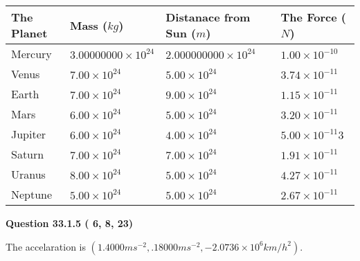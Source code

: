 \documentclass[12pt]{article}
\begin{document}
 
\begin{tabular}{|l|l|l|l|}
\hline
The Planet & Mass ($kg$) & Distanace from Sun ($m$) & The Force ($N$)\\
\hline
Mercury  &
           $ %
3.00000000 \times 10^{24}  $   &
             $ %
2.000000000 \times 10^{24}$    & $ %
1.00 \times 10^{-10} $
\\  \hline
Venus    &
           $  %
7.00 \times 10^{24}  $     &
             $ %
5.00 \times 10^{24} $    & $ %
3.74 \times 10^{-11} $
\\  \hline
Earth    &
           $  %
7.00 \times 10^{24}$     &
             $ %
9.00 \times 10^{24} $    & $ %
1.15 \times 10^{-11} $
\\   \hline
Mars     &
           $  %
6.00 \times 10^{24} $     &
             $ %
5.00 \times 10^{24}$    & $ %
3.20 \times 10^{-11} $
\\   \hline
Jupiter  &
           $  %
6.00 \times 10^{24}  $    &
             $ %
4.00 \times 10^{24} $    & $ %
5.00 \times 10^{-11}3 $
\\  \hline
Saturn   &
           $  %
7.00 \times 10^{24}   $    &
             $ %
7.00 \times 10^{24}  $    & $ %
1.91 \times 10^{-11} $
\\  \hline
Uranus   &
           $  %
8.00 \times 10^{24} $    &
             $ %
5.00 \times 10^{24}$    & $ %
4.27 \times 10^{-11} $
\\  \hline
Neptune  &
           $  %
5.00 \times 10^{24}  $    &
             $ %
5.00 \times 10^{24} $    & $ %
2.67 \times 10^{-11} $
\\  \hline
 
\end{tabular}
 
 
 
 
  
\vspace{0.2in}
  
{\textbf{\Large{Question
33.1.5 
 (          6,          8,         23)
}}}
  
  
 
 
\noindent{}
 
 
The accelaration is
$(
1.4000ms^{-2},
.18000ms^{-2},
-2.0736 \times 10^{6}km/h^2
).
$
 
 
 
 
 
 
\noindent{}
\end{document}
